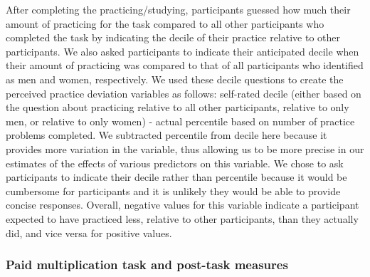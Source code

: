 \documentclass[letterpaper, nobind]{templates/ociamthesis}
\begin{document}
After completing the practicing/studying, participants guessed how much their amount of practicing for the task compared to all other participants who completed the task by indicating the decile of their practice relative to other participants. We also asked participants to indicate their anticipated decile when their amount of practicing was compared to that of all participants who identified as men and women, respectively. We used these decile questions to create the perceived practice deviation variables as follows: self-rated decile (either based on the question about practicing relative to all other participants, relative to only men, or relative to only women) - actual percentile based on number of practice problems completed. We subtracted percentile from decile here because it provides more variation in the variable, thus allowing us to be more precise in our estimates of the effects of various predictors on this variable. We chose to ask participants to indicate their decile rather than percentile because it would be cumbersome for participants and it is unlikely they would be able to provide concise responses. Overall, negative values for this variable indicate a participant expected to have practiced less, relative to other participants, than they actually did, and vice versa for positive values.

\hypertarget{paid-multiplication-task-and-post-task-measures}{%
\subsubsection{Paid multiplication task and post-task measures}\label{paid-multiplication-task-and-post-task-measures}}
\end{document}
